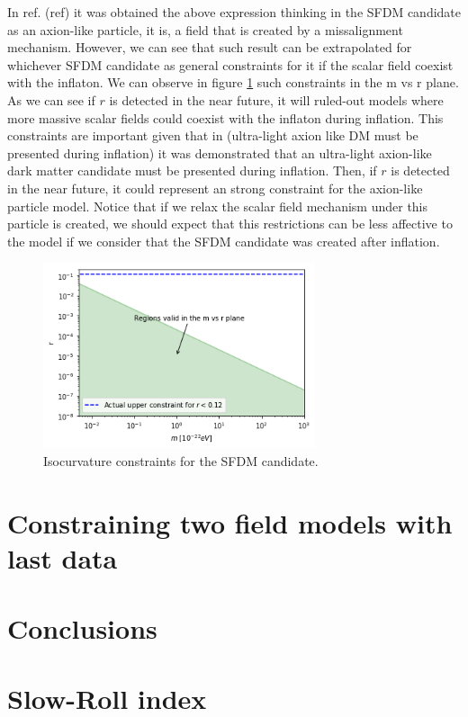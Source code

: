 \documentclass[a4paper,fleqn,usenatbib,useAMS]{mnras}
\begin{document}
In ref. (ref) it was obtained the above expression thinking in the SFDM candidate as an axion-like particle, it is, a field that is created by a missalignment mechanism. However, we can see that such result can be extrapolated for whichever SFDM candidate as general constraints for it if the scalar field coexist with the inflaton. We can observe in figure \ref{constraintsSFDM} such constraints in the m vs r plane. As we can see if $r$ is detected in the near future, it will ruled-out models where more massive scalar fields could coexist with the inflaton during inflation. This constraints are important given that in (ultra-light axion like DM must be presented during inflation) it was demonstrated that an ultra-light axion-like dark matter candidate must be presented during inflation. Then, if $r$ is detected in the near future, it could represent an strong constraint for the axion-like particle model. Notice that if we relax the scalar field mechanism under this particle is created, we should expect that this restrictions can be less affective to the model if we consider that the SFDM candidate was created after inflation. 

\begin{figure}
\includegraphics[width=8cm]{SFDMconstraints.png}
\caption{Isocurvature constraints for the SFDM candidate.}\label{constraintsSFDM}
\end{figure}
\section{Constraining two field models with last data}
\section{Conclusions}
\appendix
\section{Slow-Roll index}
\end{document}
